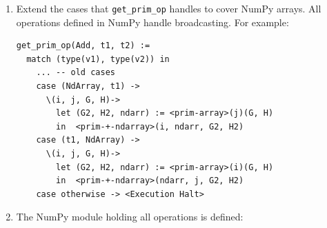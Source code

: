 \documentclass[
11pt, %
english, %
singlespacing, %
headsepline, %
]{MastersDoctoralThesis} %
\begin{document}
\begin{enumerate}
  Note: The values stored inside a NumPy array are consider irrelevant
  in this work. The Value Analysis built in this work considers only the
  shape of tensors, as tensors can be huge and their contents do not
  often influence their shape. Therefore, it would be wasteful to give a
  detailed formalisation of the NumPy library primitives.

  Nonetheless, defining formaly each one of the NumPy functions above is
  fairly straightforward. Although, the hardest part of a formal
  defitinion of Numpy arrays is detailing how \texttt{array} works. To
  define the function \texttt{\textless{}np-array\textgreater{}} one
  must consider the many input cases it can handle, and it can handle
  almost any Python object\footnote{The NumPy function \texttt{array}
    takes almost anything as an input. \texttt{arrays} tries to
    interpret its input as an array in any way it can. There is no
    formal definition of how the values are interpreted althought its
    semantics can be extracted by looking at its C implementation:
    https://stackoverflow.com/a/40380014}.

  Once the \texttt{\textless{}np-array\textgreater{}} function is
  implemented all other functions are much simpler to define. As an
  example, the implementation of the function \texttt{size} is:

\begin{verbatim}
<prim-np-size>(val)(G, H) :=
   -- We know that `<prim-array>` always returns an NdArray
   let (G, H, (NdArray, addr, arr)) := <prim-array>(val)(G, H)
   -- We know that a NdArray has a special value called `shape`
       (Tuple, addrtup, tup) := arr('shape')
   in  tup('size')
\end{verbatim}
\item
  Extend the cases that \texttt{get\_prim\_op} handles to cover NumPy
  arrays. All operations defined in NumPy handle broadcasting.
  {} For example:

\begin{verbatim}
get_prim_op(Add, t1, t2) :=
  match (type(v1), type(v2)) in
    ... -- old cases
    case (NdArray, t1) ->
      \(i, j, G, H)->
        let (G2, H2, ndarr) := <prim-array>(j)(G, H)
        in  <prim-+-ndarray>(i, ndarr, G2, H2)
    case (t1, NdArray) ->
      \(i, j, G, H)->
        let (G2, H2, ndarr) := <prim-array>(i)(G, H)
        in  <prim-+-ndarray>(ndarr, j, G2, H2)
    case otherwise -> <Execution Halt>
\end{verbatim}
\item
  The NumPy module holding all operations is defined:


\end{enumerate}
\end{document}
